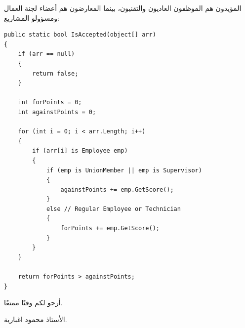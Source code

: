 \documentclass[14pt]{extarticle}
\begin{document}
\clearpage

\begin{boxSolution}
المؤيدون هم الموظفون العاديون والتقنيون، بينما المعارضون هم أعضاء لجنة العمال ومسؤولو المشاريع:
{\small
\begin{english}
\begin{verbatim}
public static bool IsAccepted(object[] arr)
{
    if (arr == null)
    {
        return false;
    }

    int forPoints = 0;
    int againstPoints = 0;

    for (int i = 0; i < arr.Length; i++)
    {
        if (arr[i] is Employee emp)
        {
            if (emp is UnionMember || emp is Supervisor)
            {
                againstPoints += emp.GetScore();
            }
            else // Regular Employee or Technician
            {
                forPoints += emp.GetScore();
            }
        }
    }

    return forPoints > againstPoints;
}
\end{verbatim}
\end{english}
}
\end{boxSolution}

\fi

\vspace{1cm}
\begin{flushleft}
أرجو لكم وقتًا ممتعًا.

الأستاذ محمود اغبارية.
\end{flushleft}
\end{document}
